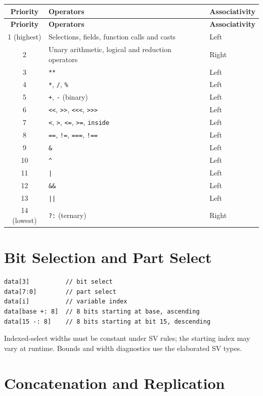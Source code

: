 \documentclass[lang=en,11pt]{elegantbook}
\newcommand{\code}[1]{\texttt{#1}}
\begin{document}
\begin{table}[htbp]
\centering
\begin{longtable}{cll}
\toprule
\textbf{Priority} & \textbf{Operators} & \textbf{Associativity} \\
\midrule
\endfirsthead
\toprule
\textbf{Priority} & \textbf{Operators} & \textbf{Associativity} \\
\midrule
\endhead
1 (highest) & Selections, fields, function calls and casts & Left \\
2 & Unary arithmetic, logical and reduction operators & Right \\
3 & \code{**} & Left \\
4 & \code{*}, \code{/}, \code{\%} & Left \\
5 & \code{+}, \code{-} (binary) & Left \\
6 & \code{<<}, \code{>>}, \code{<<<}, \code{>>>} & Left \\
7 & \code{<}, \code{>}, \code{<=}, \code{>=}, \code{inside} & Left \\
8 & \code{==}, \code{!=}, \code{===}, \code{!==} & Left \\
9 & \code{\&} & Left \\
10 & \code{\^} & Left \\
11 & \code{|} & Left \\
12 & \code{\&\&} & Left \\
13 & \code{||} & Left \\
14 (lowest) & \code{?:} (ternary) & Right \\
\bottomrule
\end{longtable}
\end{table}

\section{Bit Selection and Part Select}

\begin{lstlisting}[language=Slip]
data[3]          // bit select
data[7:0]        // part select
data[i]          // variable index
data[base +: 8]  // 8 bits starting at base, ascending
data[15 -: 8]    // 8 bits starting at bit 15, descending
\end{lstlisting}

Indexed-select widths must be constant under SV rules; the starting index may
vary at runtime. Bounds and width diagnostics use the elaborated SV types.

\section{Concatenation and Replication}
\end{document}
